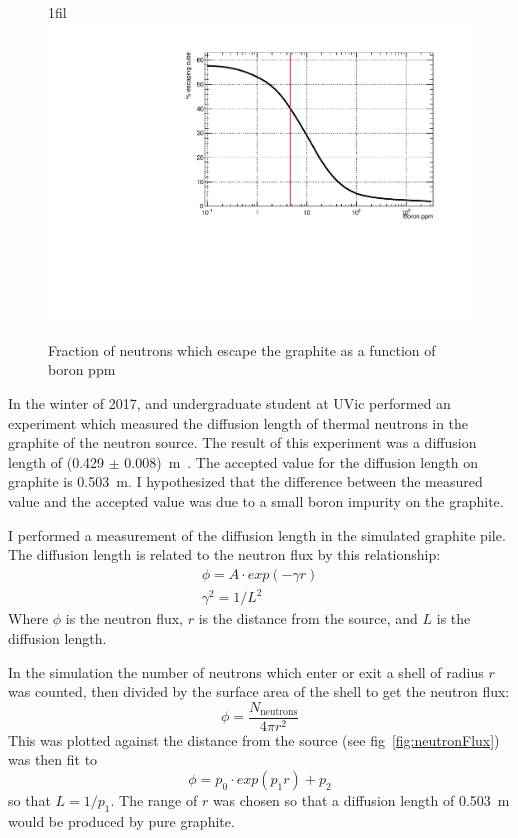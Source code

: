 \documentclass{article}
\makeatletter
\newcommand*{\centerfloat}{%
  \parindent \z@
  \leftskip \z@ \@plus 1fil \@minus \textwidth
  \rightskip\leftskip
  \parfillskip \z@skip}
\makeatother
\begin{document}
\begin{figure}
	\centerfloat
	\includegraphics[width=\columnwidth]{images/BoronEscape}
	\caption{Fraction of neutrons which escape the graphite as a function of boron ppm}	
	\label{fig:boronExcape}
\end{figure}




	In the winter of 2017, and undergraduate student at UVic performed an experiment which measured the diffusion length of thermal neutrons in the graphite of the neutron source. The result of this experiment was a diffusion length of (0.429 $\pm$ 0.008)~m~\cite{undergradExpt}. The accepted value for the diffusion length on graphite is 0.503~m. I hypothesized that the difference between the measured value and the accepted value was due to a small boron impurity on the graphite. 




	I performed a measurement of the diffusion length in the simulated graphite pile. The diffusion length is related to the neutron flux by this relationship:
\begin{subequations}
\begin{align}
		{\phi = A\cdot exp(-\gamma r)}\\
		{\gamma^2 = 1/L^2}
\end{align}
\end{subequations}
Where $\phi$ is the neutron flux, $r$ is the distance from the source, and $L$ is the diffusion length.

	In the simulation the number of neutrons which enter or exit a shell of radius $r$ was counted, then divided by the surface area of the shell to get the neutron flux:
\begin{equation}
	{\phi = \frac{N_{\mathrm{neutrons}}} {4\pi r^2}   }
\end{equation}
This was plotted against the distance from the source (see fig~\ref{fig:neutronFlux}) was then fit to 
\begin{equation}
	{\phi = p_{0}\cdot exp(p_{1} r) + p_{2}}
\end{equation}
so that $L=1/p_{1}$. The range of $r$ was chosen so that a diffusion length of 0.503~m would be produced by pure graphite.
\end{document}
